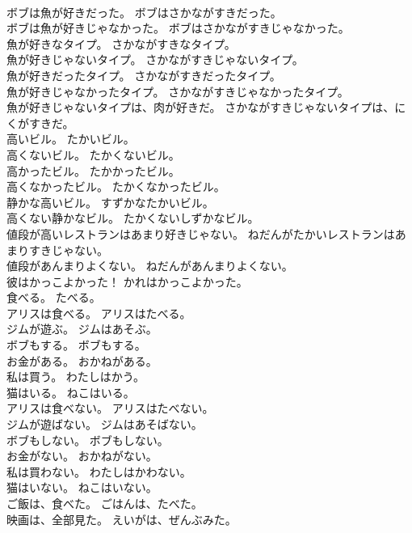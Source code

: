 \documentclass[8pt]{extreport}
\begin{document}
\begin{CJK}{UTF8}{min}
\\	ボブは魚が好きだった。	ボブはさかながすきだった。	
\\	ボブは魚が好きじゃなかった。	ボブはさかながすきじゃなかった。	
\\	魚が好きなタイプ。	さかながすきなタイプ。	
\\	魚が好きじゃないタイプ。	さかながすきじゃないタイプ。	
\\	魚が好きだったタイプ。	さかながすきだったタイプ。	
\\	魚が好きじゃなかったタイプ。	さかながすきじゃなかったタイプ。	
\\	魚が好きじゃないタイプは、肉が好きだ。	さかながすきじゃないタイプは、にくがすきだ。	
\\	高いビル。	たかいビル。	
\\	高くないビル。	たかくないビル。	
\\	高かったビル。	たかかったビル。	
\\	高くなかったビル。	たかくなかったビル。	
\\	静かな高いビル。	すずかなたかいビル。	
\\	高くない静かなビル。	たかくないしずかなビル。	
\\	値段が高いレストランはあまり好きじゃない。	ねだんがたかいレストランはあまりすきじゃない。	
\\	値段があんまりよくない。	ねだんがあんまりよくない。	
\\	彼はかっこよかった！	かれはかっこよかった。	
\\	食べる。	たべる。	
\\	アリスは食べる。	アリスはたべる。	
\\	ジムが遊ぶ。	ジムはあそぶ。	
\\	ボブもする。	ボブもする。	
\\	お金がある。	おかねがある。	
\\	私は買う。	わたしはかう。	
\\	猫はいる。	ねこはいる。	
\\	アリスは食べない。	アリスはたべない。	
\\	ジムが遊ばない。	ジムはあそばない。	
\\	ボブもしない。	ボブもしない。	
\\	お金がない。	おかねがない。	
\\	私は買わない。	わたしはかわない。	
\\	猫はいない。	ねこはいない。	
\\	ご飯は、食べた。	ごはんは、たべた。	
\\	映画は、全部見た。	えいがは、ぜんぶみた。	

\end{CJK}
\end{document}
